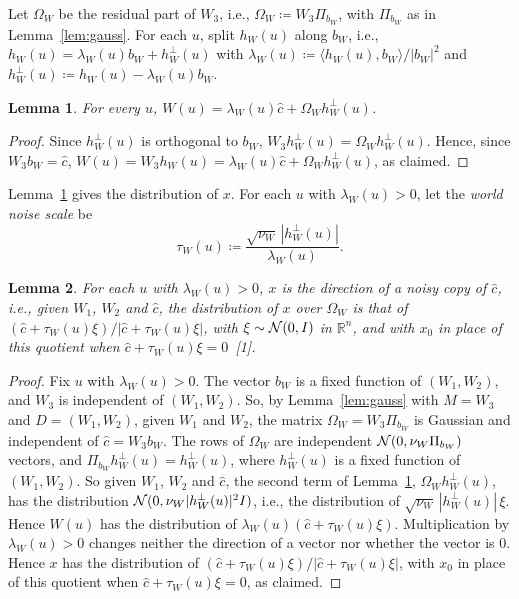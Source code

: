 \documentclass[10pt]{article}
\newcommand{\leanmark}[1]{{\relscale{0.78}\color{gray}[#1]}}
\newtheorem{lemma}{Lemma}
\newcommand{\RR}{\mathbb{R}}
\newcommand{\chat}{\hat c}
\begin{document}
\begin{enumerate}[leftmargin=*,itemsep=8pt,topsep=10pt plus 2pt]
  Let $\Omega_W$ be the residual part of $W_3$,
  i.e., $\Omega_W\coloneqq W_3\Pi_{b_W}$, with $\Pi_{b_W}$ as in
  Lemma~\ref{lem:gauss}. For each $u$, split
  $h_W(u)$ along $b_W$, i.e., $h_W(u)=\lambda_W(u)b_W+h_W^\perp(u)$ with
  $\lambda_W(u)\coloneqq \langle h_W(u),b_W\rangle/|b_W|^2$ and
  $h_W^\perp(u)\coloneqq h_W(u)-\lambda_W(u)b_W$.
  \begin{lemma}\label{lem:wsplit}
    For every $u$, $W(u)=\lambda_W(u)\chat+\Omega_Wh_W^\perp(u)$.
  \end{lemma}
  \begin{proof}
  Since $h_W^\perp(u)$ is orthogonal to $b_W$,
  $W_3h_W^\perp(u)=\Omega_Wh_W^\perp(u)$. Hence, since $W_3b_W=\chat$,
  $W(u)=W_3h_W(u)=\lambda_W(u)\chat+\Omega_Wh_W^\perp(u)$, as claimed.
  \end{proof}
  Lemma~\ref{lem:wsplit} gives the distribution of $x$. For each $u$ with
  $\lambda_W(u)>0$, let the \emph{world noise scale} be
  \[\tau_W(u)\coloneqq \frac{\sqrt{\nu_W}\,|h_W^\perp(u)|}{\lambda_W(u)}.\]
  \begin{lemma}\label{lem:noisy}
    For each $u$ with $\lambda_W(u)>0$, $x$ is the direction of a noisy copy
    of $\chat$, i.e., given $W_1$, $W_2$ and $\chat$, the distribution of $x$
    over $\Omega_W$ is that of $(\chat+\tau_W(u)\xi)/|\chat+\tau_W(u)\xi|$,
    with $\xi\sim\mathcal{N}(0,I)$ in $\RR^n$, and with $x_0$ in place of this
    quotient when $\chat+\tau_W(u)\xi=0$~\leanmark{1}.
  \end{lemma}
  \begin{proof}
  Fix $u$ with
  $\lambda_W(u)>0$. The vector $b_W$ is a fixed function of $(W_1,W_2)$, and
  $W_3$ is independent of $(W_1,W_2)$. So, by Lemma~\ref{lem:gauss} with
  $M=W_3$ and $D=(W_1,W_2)$, given $W_1$ and $W_2$, the matrix
  $\Omega_W=W_3\Pi_{b_W}$ is Gaussian and independent of $\chat=W_3b_W$. The
  rows of $\Omega_W$ are independent $\mathcal{N}(0,\nu_W\Pi_{b_W})$ vectors, and
  $\Pi_{b_W}h_W^\perp(u)=h_W^\perp(u)$, where $h_W^\perp(u)$ is a fixed function of
  $(W_1,W_2)$. So given $W_1$, $W_2$ and $\chat$, the second term of
  Lemma~\ref{lem:wsplit}, $\Omega_Wh_W^\perp(u)$, has the distribution
  $\mathcal{N}(0,\nu_W|h_W^\perp(u)|^2I)$, i.e., the distribution of
  $\sqrt{\nu_W}\,|h_W^\perp(u)|\,\xi$. Hence $W(u)$ has the distribution of
  $\lambda_W(u)(\chat+\tau_W(u)\xi)$. Multiplication by $\lambda_W(u)>0$
  changes neither the direction of a vector nor whether the vector is $0$.
  Hence $x$ has the distribution of
  $(\chat+\tau_W(u)\xi)/|\chat+\tau_W(u)\xi|$, with $x_0$ in place of this
  quotient when $\chat+\tau_W(u)\xi=0$, as claimed.

\end{proof}
\end{enumerate}
\end{document}
